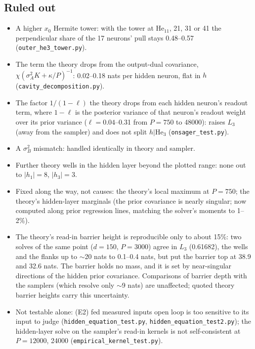 \documentclass[11pt,a4paper]{article}
\newcommand{\mworked}{\textcolor{worked}{\Large$\bm\checkmark$}}
\newcommand{\mfailed}{\textcolor{failed}{\Large$\bm\times$}}
\newcommand{\munclear}{\textcolor{unclear}{\Large\textbf{?}}}
\newcommand{\worked}{\item[\mworked]}
\newcommand{\failed}{\item[\mfailed]}
\newcommand{\unclear}{\item[\munclear]}
\begin{document}
\subsection*{Ruled out}
\begin{itemize}
\failed A higher $x_0$ Hermite tower: with the tower at $\mathrm{He}_{11}$, 21, 31 or 41 the perpendicular share of the
  17 neurons' pull stays 0.48--0.57 (\texttt{outer\_he3\_tower.py}).
\failed The term the theory drops from the output-dual covariance, $\chi(\sigma_A^2K+\kappa/P)^{-1}$: 0.02--0.18 nats per
  hidden neuron, flat in $h$ (\texttt{cavity\_decomposition.py}).
\failed The factor $1/(1-\ell)$ the theory drops from each hidden neuron's readout term, where $1-\ell$ is the posterior variance of that neuron's readout weight over its prior variance ($\ell=0.04$--0.31 from $P=750$ to 48000): raises $L_3$ (away from the sampler) and
  does not split $h|\mathrm{He}_3$ (\texttt{onsager\_test.py}).
\failed A $\sigma_B^2$ mismatch: handled identically in theory and sampler.
\failed Further theory wells in the hidden layer beyond the plotted range: none out to $|h_1|=8$, $|h_3|=3$.
\worked Fixed along the way, not causes: the theory's local maximum at $P=750$; the theory's hidden-layer marginals
  (the prior covariance is nearly singular; now computed along prior regression lines, matching the solver's moments
  to 1--2\%).
\unclear The theory's read-in barrier height is reproducible only to about 15\%: two solves of the same point
  ($d=150$, $P=3000$) agree in $L_3$ (0.61682), the wells and the flanks up to $\sim$20 nats to 0.1--0.4 nats, but put
  the barrier top at 38.9 and 32.6 nats. The barrier holds no mass, and it is set by near-singular directions of the
  hidden prior covariance. Comparisons of barrier depth with the samplers (which resolve only $\sim$9 nats) are
  unaffected; quoted theory barrier heights carry this uncertainty.
\unclear Not testable alone: (E2) fed measured inputs open loop is too sensitive to its input to judge
  (\texttt{hidden\_equation\_test.py}, \texttt{hidden\_equation\_test2.py}); the hidden-layer solve on the sampler's
  read-in kernels is not self-consistent at $P=12000$, 24000 (\texttt{empirical\_kernel\_test.py}).
\end{itemize}
\end{document}
